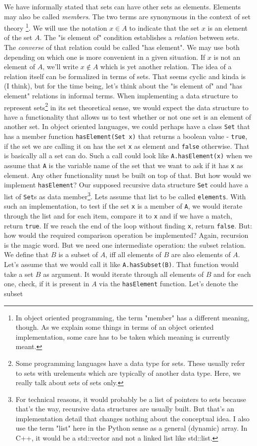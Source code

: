 We have informally stated that sets can have other sets as elements. Elements may also be called \emph{members}. The two terms are synonymous in the context of set theory \footnote{In object oriented programming, the term "member" has a different meaning, though. As we explain some things in terms of an object oriented implementation, some care has to be taken which meaning is currently meant.}. We will use the notation $x \in A$ to indicate that the set $x$ is an element of the set $A$. The "is element of" condition establishes a \emph{relation} between sets. The \emph{converse} of that relation could be called  "has element". We may use both depending on which one is more convenient in a given situation. If $x$ is not an element of $A$, we'll write $x \notin A$ which is yet another relation. The idea of a relation itself can be formalized in terms of sets. That seems cyclic and kinda is (I think), but for the time being, let's think about the "is element of" and "has element" relations in informal terms.  When implementing a data structure to represent sets\footnote{Some programming languages have a data type for sets. These usually refer to sets with urelements which are typically of another data type. Here, we really talk about sets of sets only.} in its set theoretical sense, we would expect the data structure to have a functionality that allows us to test whether or not one set is an element of another set. In object oriented languages, we could perhaps have a class \verb|Set| that has a member function \verb|hasElement(Set x)| that returns a boolean value - \verb|true|, if the set we are calling it on has the set \verb|x| as element and \verb|false| otherwise. That is basically all a set can do. Such a call could look like \verb|A.hasElement(x)| when we assume that \verb|A| is the variable name of the set that we want to ask if it has \verb|x| as element. Any other functionality must be built on top of that. But how would we implement \verb|hasElement|? Our supposed recursive data structure \verb|Set| could have a list of \verb|Set|s as data member\footnote{For technical reasons, it would probably be a list of pointers to sets because that's the way, recursive data structures are usually built. But that's an implementation detail that changes nothing about the conceptual idea. I also use the term "list" here in the Python sense as a general (dynamic) array. In C++, it would be a std::vector and not a linked list like std::list.}. Lets assume that list to be called \verb|elements|. With such an implementation, to test if the set \verb|x| is a member of \verb|A|, we would iterate through the list and for each item, compare it to \verb|x| and if we have a match, return \verb|true|. If we reach the end of the loop without finding \verb|x|, return \verb|false|. But: how would the required comparison operation be implemented? Again, recursion is the magic word. But we need one intermediate operation: the subset relation. We define that $B$ is a subset of $A$, iff all elements of $B$ are also elements of $A$. Let's assume that we would call it like \verb|A.hasSubset(B)|. That function would take a set $B$ as argument. It would iterate through all elements of $B$ and for each one, check, if it is present in $A$ via the \verb|hasElement| function. Let's denote the subset 